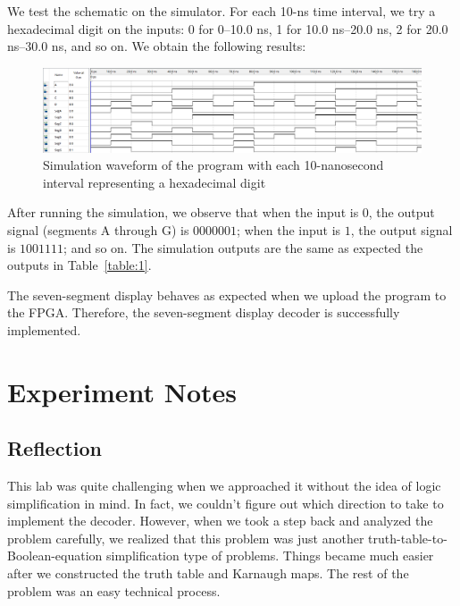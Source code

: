 \documentclass[12pt]{article}
\begin{document}
We test the schematic on the simulator. For each 10-ns time interval, we try a hexadecimal digit on the inputs: 0 for 0--10.0 ns, 1 for 10.0 ns--20.0 ns, 2 for 20.0 ns--30.0 ns, and so on. We obtain the following results:

\begin{figure}[ht]
  \centering
  \includegraphics[width=\textwidth]{lab3_simulation.png}
  \caption{Simulation waveform of the program with each 10-nanosecond interval representing a hexadecimal digit}
  \label{figure:5}
\end{figure}

After running the simulation, we observe that when the input is $0$, the output signal (segments A through G) is $0000001$; when the input is $1$, the output signal is $1001111$; and so on. The simulation outputs are the same as expected the outputs in Table~\ref{table:1}.

The seven-segment display behaves as expected when we upload the program to the FPGA. Therefore, the seven-segment display decoder is successfully implemented.

\section{Experiment Notes}

\subsection*{Reflection}

This lab was quite challenging when we approached it without the idea of logic simplification in mind. In fact, we couldn't figure out which direction to take to implement the decoder. However, when we took a step back and analyzed the problem carefully, we realized that this problem was just another truth-table-to-Boolean-equation simplification type of problems. Things became much easier after we constructed the truth table and Karnaugh maps. The rest of the problem was an easy technical process.
\end{document}
